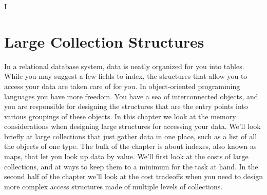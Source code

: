 I\chapter{Large Collection Structures}
\label{chapter:tables-indexes}

In a relational database system, data is neatly organized for you into tables.
While you may suggest a few fields to index, the structures that
allow you to access your data are taken care of for you.  In object-oriented
programming languages you have more freedom. You have a sea of interconnected
objects, and you are responsible for designing the structures that are the entry
points into various groupings of these objects.
In this chapter we look at the memory considerations when
designing large structures for accessing your
data. We'll
look briefly at large collections that just gather data in one place, such as a
list of all the objects of one type. The bulk of the chapter is about
indexes, also known as maps, that let you look up data by value. We'll first look at the costs of large collections,
and at ways to keep them to a minimum for the task at hand. In the second half
of the chapter we'll look at the cost tradeoffs when you need to
design more complex access structures made of multiple levels of collections.  









